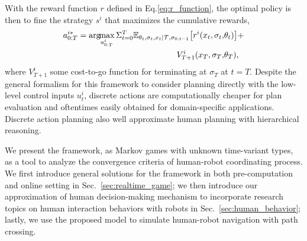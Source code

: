 \documentclass[letterpaper, 10 pt, conference]{ieeeconf}  %
\newcommand{\argmax}{\arg\!\!\max}
\begin{document}
With the reward function $r$ defined in Eq.\ref{eq:r_function}, the optimal 
policy is then to fine the strategy $s^i$ that maximizes the cumulative 
rewards,
\begin{equation}\label{eq:optimal}
\begin{aligned}
  a^{i*}_{0:T} = \argmax_{a^i_{0:T}} 
  \Sigma_{t=0}^{T} 
  \mathbb{E}_{\theta_t,\sigma_{t},x_t|\mathcal{T},\sigma_{0:t-1}} \big{[}
  r^i(x_t,\sigma_t,&\theta_t)\big{]}+ \\ 
  V^i_{T+1}(x_T,\sigma_T,&\theta_T), 
\end{aligned}
\end{equation}
where $V^i_{T+1}$ some cost-to-go function for terminating at $\sigma_T$ at 
$t=T$.
Despite the general formalism for this framework to consider planning directly 
with the low-level control inputs $u^i_t$, discrete actions are 
computationally cheaper for plan evaluation and oftentimes easily obtained for 
domain-specific applications. Discrete action planning also well approximate 
human planning with hierarchical reasoning. 

We present the framework, as Markov games with unknown time-variant types,  
as a tool to analyze the convergence criteria of human-robot coordinating 
process. We first 
introduce general solutions for the framework in both pre-computation and 
online setting in Sec.~\ref{sec:realtime_game}; we then introduce our approximation of human 
decision-making mechanism to incorporate research topics on 
human interaction behaviors with robots in Sec.~\ref{sec:human_behavior}; 
lastly, we use the proposed model to simulate human-robot navigation with path 
crossing.


\vspace{-.2em}
\end{document}
